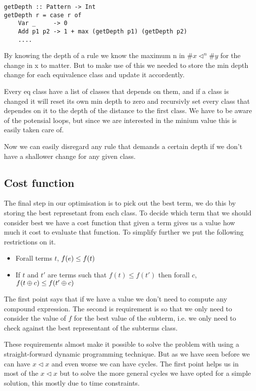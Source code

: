 \begin{verbatim}
getDepth :: Pattern -> Int
getDepth r = case r of
    Var _     -> 0
    Add p1 p2 -> 1 + max (getDepth p1) (getDepth p2)
    ....
\end{verbatim}

By knowing the depth of a rule we know the maximum n in $\#x \lhd^n \#y$ for the change in x to matter. But to make use of this we needed to store the min depth change for each equivalence class and update it accordently.

Every eq class have a list of classes that depends on them, and if a class is changed it will reset its own min depth to zero and recursivly set every class that dependes on it to the depth of the distance to the first class. We have to be aware of the potensial loops, but since we are interested in the minium value this is easily taken care of.

Now we can easily disregard any rule that demands a certain depth if we don't have a shallower change for any given class.


\subsection{Cost function}
The final step in our optimisation is to pick out the best term, we do this by
storing the best represetant from each class. To decide which term that we should
consider best we have a cost function that given a term gives us a value how
much it cost to evaluate that function. To simplify further we put the following
restrictions on it.

\begin{itemize}
  \item Forall terms $t$, $f(e) \le f(t)$
  \item If $t$ and $t'$ are terms such that $f(t) \le f(t')$ then forall $c$,
         $f(t \oplus c) \le f(t' \oplus c)$
\end{itemize}

The first point says that if we have a value we don't need to compute any compound
expression. The second is requirement is so that we only need to consider the value
of $f$ for the best value of the subterm, i.e. we only need to check against the
best representant of the subterms class.

These requirements almost make it possible to solve the problem with using a 
straight-forward dynamic programming technique. But as we have seen before we can
have $x \lhd x$ and even worse we can have cycles. The first point helps us in most
of the $x \lhd x$ but to solve the more general cycles we have opted for a simple 
solution, this mostly due to time constraints.

